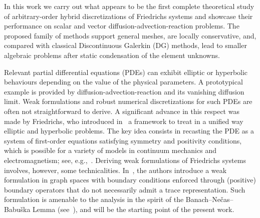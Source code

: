 \documentclass[11pt,a4paper]{article}
\theoremstyle{plain}
\theoremstyle{remark}
\theoremstyle{definition}
\begin{document}
In this work we carry out what appears to be the first complete theoretical study of arbitrary-order hybrid discretizations of Friedrichs systems and showcase their performance on scalar and vector diffusion-advection-reaction problems.
The proposed family of methods support general meshes, are locally conservative, and, compared with classical Discontinuous Galerkin (DG) methods, lead to smaller algebraic problems after static condensation of the element unknowns.
\smallskip

Relevant partial differential equations (PDEs) can exhibit elliptic or hyperbolic behaviours depending on the value of the physical parameters.
A prototypical example is provided by diffusion-advection-reaction and its vanishing diffusion limit.
Weak formulations and robust numerical discretizations for such PDEs are often not straightforward to derive.
A significant advance in this respect was made by Friedrichs, who introduced in~\cite{Friedrichs:58} a framework to treat in a unified way elliptic and hyperbolic problems.
The key idea consists in recasting the PDE as a system of first-order equations satisfying symmetry and positivity conditions, which is possible for a variety of models in continuum mechanics and electromagnetism; see, e.g.,~\cite[Section~56.2]{Ern.Guermond:21*2}.
Deriving weak formulations of Friedrichs systems involves, however, some technicalities.
In~\cite{Ern.Guermond:06}, the authors introduce a weak formulation in graph spaces with boundary conditions enforced through (positive) boundary operators that do not necessarily admit a trace representation.
Such formulation is amenable to the analysis in the spirit of the Banach--Ne\v{c}as--Babu\v{s}ka Lemma (see~\cite[Chapter~56]{Ern.Guermond:21*2}), and will be the starting point of the present work.
\smallskip
\end{document}
